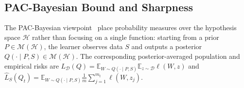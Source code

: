 \documentclass[10pt]{article} %
\newtheorem{theorem}{Theorem}
\begin{document}


\subsection{PAC-Bayesian Bound and Sharpness}

The PAC-Bayesian viewpoint~\cite{mcallesterPACBayesianModelAveraging1999,mcallesterPACBayesianStochasticModel2003} place probability measures over the hypothesis space $\mathcal{H}$ rather than focusing on a single function: starting from a prior $P\in\mathcal M(\mathcal H)$, the learner observes data $S$ and outputs a posterior $Q(\cdot\mid P,S)\in\mathcal M(\mathcal H)$. The corresponding posterior-averaged population and empirical risks  are $
L_{\mathcal D}(Q)
=
\mathbb E_{W \sim Q(\cdot \mid P,S)}\mathbb E_{z\sim\mathcal D}\ell(W,z)
$ and
$
\hat L_{S}(Q_t)
=
\mathbb E_{W \sim Q(\cdot \mid P,S)}\frac{1}{m}\sum_{j=1}^{m_t}\ell(W,z_{j}).
$
\end{document}
